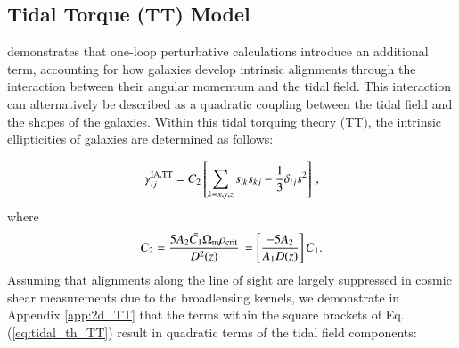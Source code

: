 

\subsection{Tidal Torque (TT) Model}
\label{subsec:IA_th_TT}

\citet{Blazek2019} demonstrates that one-loop perturbative calculations introduce an additional term, accounting for how galaxies develop intrinsic alignments through the interaction between their angular momentum and the tidal field.
This interaction can alternatively be described as a quadratic coupling between the tidal field and the shapes of the galaxies. 
Within this tidal torquing theory (TT), the intrinsic ellipticities of galaxies are determined as follows:

\begin{eqnarray}
\gamma_{ij}^{\rm IA, TT} = C_2 \left[ \sum_{k=x,y,z} s_{ik} s_{kj} -\frac{1}{3} \delta_{ij} s^2 \right] \, ,
\label{eq:tidal_th_TT}
\end{eqnarray}
where 
\begin{eqnarray}
C_2 = \frac{5 A_2 \bar{C_1} \Omega_{\rm m} \rho_{\rm crit}}{D^2(z)} \,  = \left[ \frac{-5 A_2}{A_1 D(z)} \right] C_1.
\end{eqnarray}
Assuming that alignments along the line of sight are largely suppressed in cosmic shear measurements due to the broadlensing kernels, we demonstrate in Appendix \ref{app:2d_TT} that the terms within the square brackets of Eq. (\ref{eq:tidal_th_TT}) result in quadratic terms of the tidal field components:

